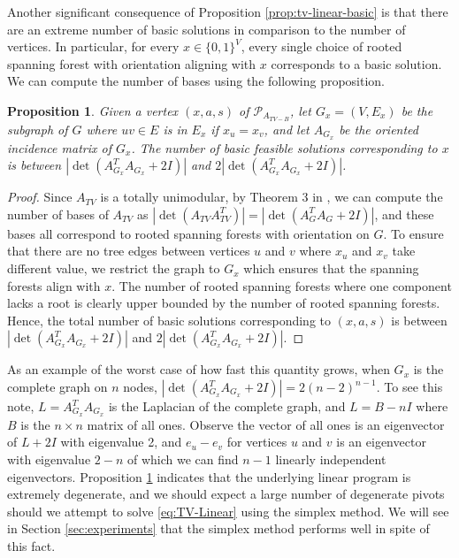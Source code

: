 \documentclass[titlepage,11pt]{article}
\newtheorem{proposition}{Proposition}
\begin{document}
Another significant consequence of Proposition \ref{prop:tv-linear-basic} is that there are an extreme number of basic solutions in comparison to the number of vertices. In particular, for every $x \in \{0,1\}^V$, every single choice of rooted spanning forest with orientation aligning with $x$ corresponds to a basic solution. We can compute the number of bases using the following proposition.
\begin{proposition}\label{prop:number-of-bases}
    Given a vertex $(x, a, s)$ of $\mathcal{P}_{A_{TV-B}}$, let $G_x = (V, E_x)$ be the subgraph of $G$ where $uv \in E$ is in $E_x$ if $x_u = x_v$, and let $A_{G_x}$ be the oriented incidence matrix of $G_x$. The number of basic feasible solutions corresponding to $x$ is between $|\det(A_{G_x}^TA_{G_x} + 2I)|$ and $2|\det(A_{G_x}^TA_{G_x} + 2I)|$.
\end{proposition}
\begin{proof}
    Since $A_{TV}$ is a totally unimodular, by Theorem 3 in \cite{maurer1976matrix}, we can compute the number of bases of $A_{TV}$ as $|\det({A_{TV}A_{TV}^T})| = |\det(A_{G}^TA_G + 2I)|$, and these bases all correspond to rooted spanning forests with orientation on $G$. To ensure that there are no tree edges between vertices $u$ and $v$ where $x_u$ and $x_v$ take different value, we restrict the graph to $G_x$ which ensures that the spanning forests align with $x$. The number of rooted spanning forests where one component lacks a root is clearly upper bounded by the number of rooted spanning forests. Hence, the total number of basic solutions corresponding to $(x, a, s)$ is between $|\det(A_{G_x}^TA_{G_x} + 2I)|$ and $2|\det(A_{G_x}^TA_{G_x} + 2I)|$.
\end{proof}

As an example of the worst case of how fast this quantity grows, when $G_x$ is the complete graph on $n$ nodes, $|\det(A_{G_x}^TA_{G_x} + 2I)| = 2(n-2)^{n-1}$. To see this note, $L = A_{G_x}^TA_{G_x}$ is the Laplacian of the complete graph, and $L = B - nI$ where $B$ is the $n\times n$ matrix of all ones. Observe the vector of all ones is an eigenvector of $L + 2I$ with eigenvalue 2, and $e_u - e_v$ for vertices $u$ and $v$ is an eigenvector with eigenvalue $2-n$ of which we can find $n-1$ linearly independent eigenvectors. Proposition \ref{prop:number-of-bases} indicates that the underlying linear program is extremely degenerate, and we should expect a large number of degenerate pivots should we attempt to solve \eqref{eq:TV-Linear} using the simplex method. We will see in Section \ref{sec:experiments} that the simplex method performs well in spite of this fact.
\end{document}
